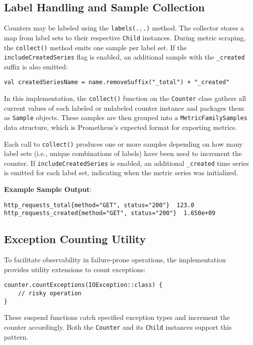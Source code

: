
\subsection{Label Handling and Sample Collection}
Counters may be labeled using the \texttt{labels(...)} method. The collector stores a map from label sets to their respective \texttt{Child} instances. During metric scraping, the \texttt{collect()} method emits one sample per label set. If the \texttt{includeCreatedSeries} flag is enabled, an additional sample with the \texttt{\_created} suffix is also emitted:
\begin{verbatim}
val createdSeriesName = name.removeSuffix("_total") + "_created"
\end{verbatim}


In this implementation, the \texttt{collect()} function on the \texttt{Counter} class gathers all current values of each labeled or unlabeled counter instance and packages them as \texttt{Sample} objects. These samples are then grouped into a \texttt{MetricFamilySamples} data structure, which is Prometheus's expected format for exporting metrics.

Each call to \texttt{collect()} produces one or more samples depending on how many label sets (i.e., unique combinations of labels) have been used to increment the counter. If \texttt{includeCreatedSeries} is enabled, an additional \texttt{\_created} time series is emitted for each label set, indicating when the metric series was initialized.

\vspace{0.5em}
\noindent
\textbf{Example Sample Output}:
\begin{verbatim}
http_requests_total{method="GET", status="200"}  123.0
http_requests_created{method="GET", status="200"}  1.650e+09
\end{verbatim}


\subsection{Exception Counting Utility}
To facilitate observability in failure-prone operations, the implementation provides utility extensions to count exceptions:
\begin{verbatim}
counter.countExceptions(IOException::class) {
    // risky operation
}
\end{verbatim}
These suspend functions catch specified exception types and increment the counter accordingly. Both the \texttt{Counter} and its \texttt{Child} instances support this pattern.



